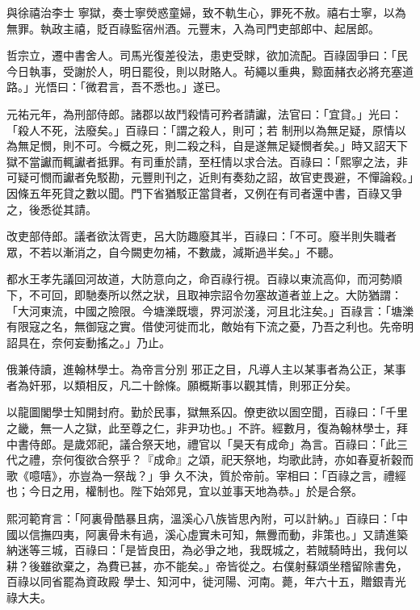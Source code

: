 \begin{pinyinscope}
 與徐禧治李士
 寧獄，奏士寧熒惑童婦，致不軌生心，罪死不赦。禧右士寧，以為無罪。執政主禧，貶百祿監宿州酒。元豐末，入為司門吏部郎中、起居郎。



 哲宗立，遷中書舍人。司馬光復差役法，患吏受賕，欲加流配。百祿固爭曰：「民今日執事，受謝於人，明日罷役，則以財賂人。茍繩以重典，黥面赭衣必將充塞道路。」光悟曰：「微君言，吾不悉也。」遂已。



 元祐元年，為刑部侍郎。諸郡以故鬥殺情可矜者請讞，法官曰：「宜貸。」光曰：「殺人不死，法廢矣。」百祿曰：「謂之殺人，則可；若
 制刑以為無足疑，原情以為無足憫，則不可。今概之死，則二殺之科，自是遂無足疑憫者矣。」時又詔天下獄不當讞而輒讞者抵罪。有司重於請，至枉情以求合法。百祿曰：「熙寧之法，非可疑可憫而讞者免駁勘，元豐則刊之，近則有奏劾之詔，故官吏畏避，不憚論殺。」因條五年死貸之數以聞。門下省猶駁正當貸者，又例在有司者還中書，百祿又爭之，後悉從其請。



 改吏部侍郎。議者欲汰胥吏，呂大防趣廢其半，百祿曰：「不可。廢半則失職者
 眾，不若以漸消之，自今闕吏勿補，不數歲，減斯過半矣。」不聽。



 都水王孝先議回河故道，大防意向之，命百祿行視。百祿以東流高仰，而河勢順下，不可回，即馳奏所以然之狀，且取神宗詔令勿塞故道者並上之。大防猶謂：「大河東流，中國之險限。今塘濼既壞，界河淤淺，河且北注矣。」百祿言：「塘濼有限寇之名，無御寇之實。借使河徙而北，敵始有下流之憂，乃吾之利也。先帝明詔具在，奈何妄動搖之。」乃止。



 俄兼侍讀，進翰林學士。為帝言分別
 邪正之目，凡導人主以某事者為公正，某事者為奸邪，以類相反，凡二十餘條。願概斯事以觀其情，則邪正分矣。



 以龍圖閣學士知開封府。勤於民事，獄無系囚。僚吏欲以圄空聞，百祿曰：「千里之畿，無一人之獄，此至尊之仁，非尹功也。」不許。經數月，復為翰林學士，拜中書侍郎。是歲郊祀，議合祭天地，禮官以「昊天有成命」為言。百祿曰：「此三代之禮，奈何復欲合祭乎？『成命』之頌，祀天祭地，均歌此詩，亦如春夏祈穀而歌《噫嘻》，亦豈為一祭哉？」爭
 久不決，質於帝前。宰相曰：「百祿之言，禮經也；今日之用，權制也。陛下始郊見，宜以並事天地為恭。」於是合祭。



 熙河範育言：「阿裏骨酷暴且病，溫溪心八族皆思內附，可以計納。」百祿曰：「中國以信撫四夷，阿裏骨未有過，溪心虛實未可知，無釁而動，非策也。」又請進築納迷等三城，百祿曰：「是皆良田，為必爭之地，我既城之，若賊騎時出，我何以耕？後雖欲棄之，為費已甚，亦不能矣。」帝皆從之。右僕射蘇頌坐稽留除書免，百祿以同省罷為資政殿
 學士、知河中，徙河陽、河南。薨，年六十五，贈銀青光祿大夫。




\end{pinyinscope}
